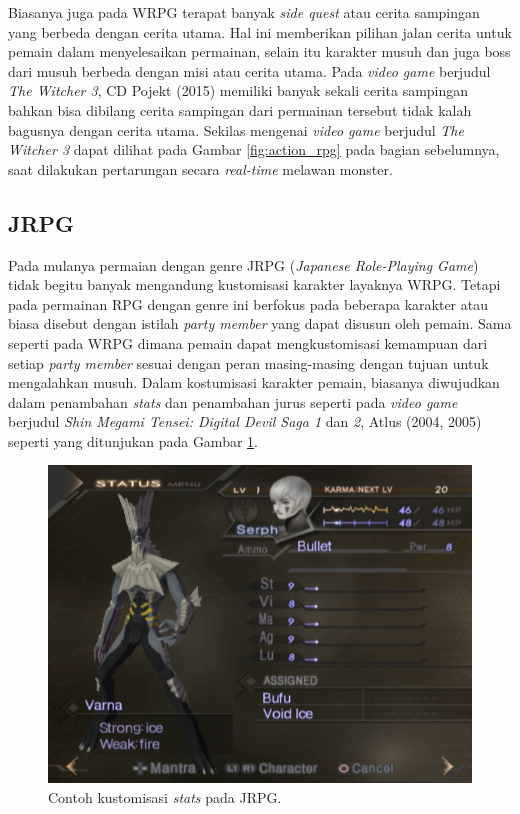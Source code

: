 Biasanya juga pada WRPG terapat banyak \textit{side quest} atau cerita sampingan yang berbeda dengan cerita utama. Hal ini memberikan pilihan jalan cerita untuk pemain dalam menyelesaikan permainan, selain itu karakter musuh dan juga boss dari musuh berbeda dengan misi atau cerita utama. Pada \textit{video game} berjudul \textit{The Witcher 3}, CD Pojekt (2015) memiliki banyak sekali cerita sampingan bahkan bisa dibilang cerita sampingan dari permainan tersebut tidak kalah bagusnya dengan cerita utama. Sekilas mengenai \textit{video game} berjudul \textit{The Witcher 3} dapat dilihat pada Gambar \ref{fig:action_rpg} pada bagian sebelumnya, saat dilakukan pertarungan secara \textit{real-time} melawan monster.
\vspace{1ex}

\subsection{JRPG}
\label{sec:sub_sec2_jrpg}

Pada mulanya permaian dengan genre JRPG (\textit{Japanese Role-Playing Game}) tidak begitu banyak mengandung kustomisasi karakter layaknya WRPG. Tetapi pada permainan RPG dengan genre ini berfokus pada beberapa karakter atau biasa disebut dengan istilah \textit{party member} yang dapat disusun oleh pemain. Sama seperti pada WRPG dimana pemain dapat mengkustomisasi kemampuan dari setiap \textit{party member} sesuai dengan peran masing-masing dengan tujuan untuk mengalahkan musuh. Dalam kostumisasi karakter pemain, biasanya diwujudkan dalam penambahan \textit{stats} dan penambahan jurus seperti pada \textit{video game} berjudul \textit{Shin Megami Tensei: Digital Devil Saga 1} dan \textit{2}, Atlus (2004, 2005) seperti yang ditunjukan pada Gambar \ref{fig:dds}.
\vspace{1ex}

\begin{figure} [!h] \centering
	\includegraphics[scale=0.48]{img/dds.jpg}
	\caption{Contoh kustomisasi \textit{stats} pada JRPG.}
	\label{fig:dds}
\end{figure}

